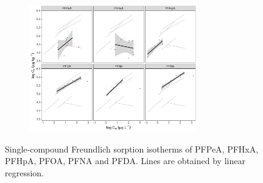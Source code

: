 \begin{figure}[t]\ContinuedFloat
        \begin{subfigure}[]{\linewidth}
            \centering
            \includegraphics[width=0.8\textwidth]{R/figs/CWC_facet_isotherm.pdf}
            \label{fig:CWC_isotherm}
        \end{subfigure}
        \caption{Single-compound Freundlich sorption isotherms of PFPeA, PFHxA, PFHpA, PFOA, PFNA and PFDA. Lines are obtained by linear regression.}
        \label{fig:sorption_isotherms_all}
\end{figure}

